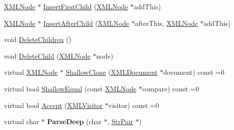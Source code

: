 \begin{DoxyCompactItemize}
\item 
\hyperlink{classtinyxml2_1_1_x_m_l_node}{X\+M\+L\+Node} $\ast$ \hyperlink{classtinyxml2_1_1_x_m_l_node_ac609a8f3ea949027f439280c640bbaf2}{Insert\+First\+Child} (\hyperlink{classtinyxml2_1_1_x_m_l_node}{X\+M\+L\+Node} $\ast$add\+This)
\item 
\hyperlink{classtinyxml2_1_1_x_m_l_node}{X\+M\+L\+Node} $\ast$ \hyperlink{classtinyxml2_1_1_x_m_l_node_a9275138a1b8dd5d8e2c26789bdc23ac8}{Insert\+After\+Child} (\hyperlink{classtinyxml2_1_1_x_m_l_node}{X\+M\+L\+Node} $\ast$after\+This, \hyperlink{classtinyxml2_1_1_x_m_l_node}{X\+M\+L\+Node} $\ast$add\+This)
\item 
void \hyperlink{classtinyxml2_1_1_x_m_l_node_a0360085cc54df5bff85d5c5da13afdce}{Delete\+Children} ()
\item 
void \hyperlink{classtinyxml2_1_1_x_m_l_node_a363b6edbd6ebd55f8387d2b89f2b0921}{Delete\+Child} (\hyperlink{classtinyxml2_1_1_x_m_l_node}{X\+M\+L\+Node} $\ast$node)
\item 
virtual \hyperlink{classtinyxml2_1_1_x_m_l_node}{X\+M\+L\+Node} $\ast$ \hyperlink{classtinyxml2_1_1_x_m_l_node_a83e3524e2ecea25eeab630c7ab113627}{Shallow\+Clone} (\hyperlink{classtinyxml2_1_1_x_m_l_document}{X\+M\+L\+Document} $\ast$document) const  =0
\item 
virtual bool \hyperlink{classtinyxml2_1_1_x_m_l_node_ac50408e91e095237f45716092ac2bddc}{Shallow\+Equal} (const \hyperlink{classtinyxml2_1_1_x_m_l_node}{X\+M\+L\+Node} $\ast$compare) const  =0
\item 
virtual bool \hyperlink{classtinyxml2_1_1_x_m_l_node_a366ad0e9b9ae8d1b18c00f903994b7a9}{Accept} (\hyperlink{classtinyxml2_1_1_x_m_l_visitor}{X\+M\+L\+Visitor} $\ast$visitor) const  =0
\item 
virtual char $\ast$ {\bfseries Parse\+Deep} (char $\ast$, \hyperlink{classtinyxml2_1_1_str_pair}{Str\+Pair} $\ast$)\hypertarget{classtinyxml2_1_1_x_m_l_node_a7610d0f603e8b603d2078521811a23c1}{}\label{classtinyxml2_1_1_x_m_l_node_a7610d0f603e8b603d2078521811a23c1}

\end{DoxyCompactItemize}
